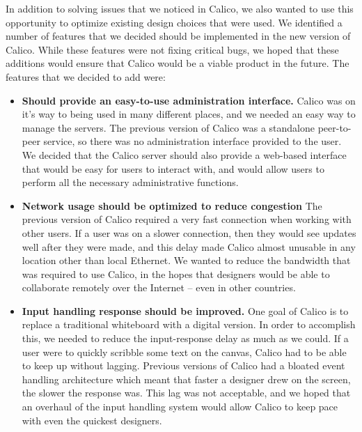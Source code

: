In addition to solving issues that we noticed in Calico, we also wanted to use this opportunity to optimize existing design choices that were used.
We identified a number of features that we decided should be implemented in the new version of Calico.
While these features were not fixing critical bugs, we hoped that these additions would ensure that Calico would be a viable product in the future. 
The features that we decided to add were:
\begin{itemize}\itemsep1pt
\item 
\textbf{Should provide an easy-to-use administration interface.}
\newline
Calico was on it's way to being used in many different places, and we needed an easy way to manage the servers. 
The previous version of Calico was a standalone peer-to-peer service, so there was no administration interface provided to the user.
We decided that the Calico server should also provide a web-based interface that would be easy for users to interact with, and would allow users to perform all the necessary administrative functions.

\item 
\textbf{Network usage should be optimized to reduce congestion}
\newline
The previous version of Calico required a very fast connection when working with other users. If a user was on a slower connection, then they would see updates well after they were made, and this delay made Calico almost unusable in any location other than local Ethernet.
We wanted to reduce the bandwidth that was required to use Calico, in the hopes that designers would be able to collaborate remotely over the Internet -- even in other countries.

\item 
\textbf{Input handling response should be improved.}
\newline
One goal of Calico is to replace a traditional whiteboard with a digital version. 
In order to accomplish this, we needed to reduce the input-response delay as much as we could. 
If a user were to quickly scribble some text on the canvas, Calico had to be able to keep up without lagging. 
Previous versions of Calico had a bloated event handling architecture which meant that faster a designer drew on the screen, the slower the response was. This lag was not acceptable, and we hoped that an overhaul of the input handling system would allow Calico to keep pace with even the quickest designers.

\end{itemize}


